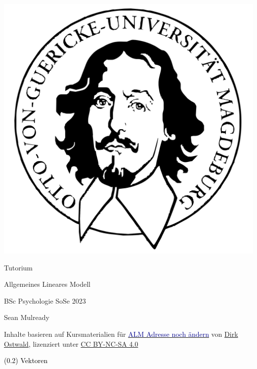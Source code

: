 \documentclass[
  8pt,
  ignorenonframetext,
]{beamer}
\author{}
\date{\vspace{-2.5em}}
\begin{document}
\begin{frame}[plain]{}
\protect\hypertarget{section}{}
\center

\begin{center}\includegraphics[width=0.2\linewidth]{../Abbildungen/wtfi_otto} \end{center}

\vspace{2mm}

\huge

Tutorium

\Large

Allgemeines Lineares Modell \vspace{4mm}

\normalsize

BSc Psychologie SoSe 2023

\vspace{12mm}
\normalsize

Sean Mulready

\vspace{3mm}
\scriptsize

Inhalte basieren auf Kursmaterialien für
\href{https://www.ipsy.ovgu.de/Institut/Abteilungen+des+Institutes/Methodenlehre+I+_+Experimentelle+und+Neurowissenschaftliche+Psychologie/Lehre/Sommersemester+2022/Allgemeines+Lineares+Modell.html}{\textcolor{darkblue}{ALM Adresse noch ändern}}
von
\href{https://www.ipsy.ovgu.de/Institut/Abteilungen+des+Institutes/Methodenlehre+I+_+Experimentelle+und+Neurowissenschaftliche+Psychologie/Team/Dirk+Ostwald.html}{Dirk
Ostwald}, lizenziert unter
\href{https://creativecommons.org/licenses/by-sa/4.0/deed.de}{CC
BY-NC-SA 4.0}
\end{frame}

\begin{frame}[plain]{}
\protect\hypertarget{section-1}{}
\vfill
\center
\huge

\textcolor{black}{(0.2) Vektoren} \vfill
\end{frame}
\end{document}
